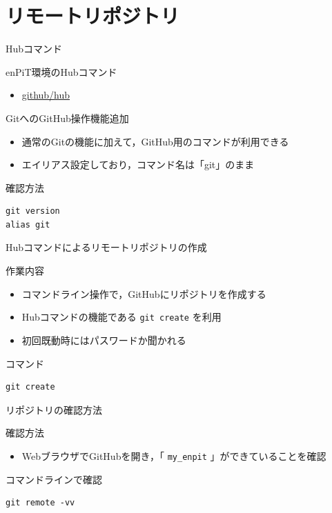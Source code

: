 \documentclass[t, aspectratio=169]{beamer}
\begin{document}
\section{リモートリポジトリ}
\label{sec-2-2}
\begin{frame}[fragile,label=sec-2-2-1]{Hubコマンド}
 \begin{block}{enPiT環境のHubコマンド}
\begin{itemize}
\item \href{https://github.com/github/hub}{github/hub}
\end{itemize}
\end{block}

\begin{block}{GitへのGitHub操作機能追加}
\begin{itemize}
\item 通常のGitの機能に加えて，GitHub用のコマンドが利用できる
\item エイリアス設定しており，コマンド名は「git」のまま
\end{itemize}
\end{block}

\begin{block}{確認方法}
\begin{verbatim}
git version
alias git
\end{verbatim}
\end{block}
\end{frame}
\begin{frame}[fragile,label=sec-2-2-2]{Hubコマンドによるリモートリポジトリの作成}
 \begin{block}{作業内容}
\begin{itemize}
\item コマンドライン操作で，GitHubにリポジトリを作成する
\item Hubコマンドの機能である \texttt{git create} を利用
\item 初回既動時にはパスワードか聞かれる
\end{itemize}
\end{block}

\begin{block}{コマンド}
\begin{verbatim}
git create
\end{verbatim}
\end{block}
\end{frame}
\begin{frame}[fragile,label=sec-2-2-3]{リポジトリの確認方法}
 \begin{block}{確認方法}
\begin{itemize}
\item WebブラウザでGitHubを開き，「 \texttt{my\_enpit} 」ができていることを確認
\end{itemize}
\end{block}

\begin{block}{コマンドラインで確認}
\begin{verbatim}
git remote -vv
\end{verbatim}
\end{block}
\end{frame}
\end{document}
